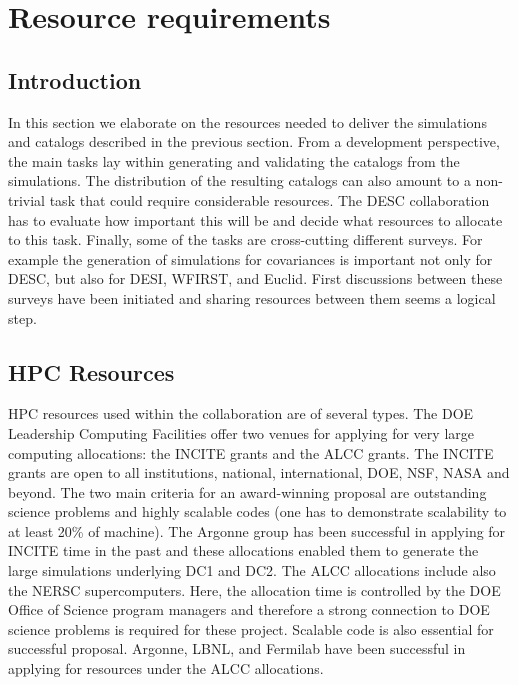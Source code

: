 \section{Resource requirements}
\resetnumbering
\label{sec:resources}



\subsection{Introduction}
\label{sec:resources:introduction}
In this section we elaborate on the resources needed to deliver the simulations and catalogs described in the previous section. From a development perspective, the main tasks lay within generating and validating the catalogs from the simulations. The distribution of the resulting catalogs can also amount to a non-trivial task that could require considerable resources. The DESC collaboration has to evaluate how important this will be and decide what resources to allocate to this task. Finally, some of the tasks are cross-cutting different surveys. For example the generation of simulations for covariances is important not only for DESC, but also for DESI, WFIRST, and Euclid. First discussions between these surveys have been initiated and sharing resources between them seems a logical step.

\subsection{HPC Resources}

HPC resources used within the collaboration are of several types. The DOE Leadership Computing Facilities offer two venues for applying for very large computing allocations: the INCITE grants and the ALCC grants. The INCITE grants are open to all institutions, national, international, DOE, NSF, NASA and beyond. The two main criteria for an award-winning proposal are outstanding science problems and highly scalable codes (one has to demonstrate scalability to at least 20\% of  machine). The Argonne group has been successful in applying for INCITE time in the past and these allocations enabled them to generate the large simulations underlying DC1 and DC2. The ALCC allocations include also the NERSC supercomputers. Here, the allocation time is controlled by the DOE Office of Science program managers and therefore a strong connection to DOE science problems is required for these project. Scalable code is also essential for successful proposal. Argonne, LBNL, and Fermilab have been successful in applying for resources under the ALCC allocations.

